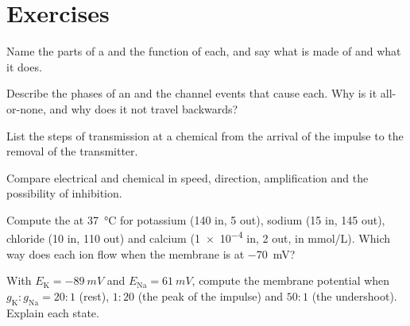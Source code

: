\section{Exercises}

\begin{exercise}[$\star$]\label{exo:b2:neurons-synapses:1}
Name the parts of a  and the function of each, and say what
 is made of and what it does.
\end{exercise}

\begin{exercise}[$\star$]\label{exo:b2:neurons-synapses:2}
Describe the phases of an  and the channel events
that cause each. Why is it all-or-none, and why does it not travel
backwards?
\end{exercise}

\begin{exercise}[$\star$]\label{exo:b2:neurons-synapses:3}
List the steps of transmission at a chemical  from the
arrival of the impulse to the removal of the transmitter.
\end{exercise}

\begin{exercise}[$\star$]\label{exo:b2:neurons-synapses:4}
Compare electrical and chemical  in speed, direction,
amplification and the possibility of inhibition.
\end{exercise}

\begin{exercise}[$\star\star$]\label{exo:b2:neurons-synapses:5}
Compute the  at \qty{37}{\celsius} for potassium
(140 in, 5 out), sodium (15 in, 145 out), chloride (10 in, 110 out)
and calcium (\qty{1e-4}{} in, 2 out, in \unit{mmol/L}). Which way
does each ion flow when the membrane is at \qty{-70}{mV}?
\end{exercise}

\begin{exercise}[$\star\star$]\label{exo:b2:neurons-synapses:6}
With $E_{\mathrm K} = \qty{-89}{mV}$ and $E_{\mathrm{Na}} =
\qty{+61}{mV}$, compute the membrane potential when $g_{\mathrm K} :
g_{\mathrm{Na}} = 20 : 1$ (rest), $1 : 20$ (the peak of the impulse)
and $50 : 1$ (the undershoot). Explain each state.
\end{exercise}

